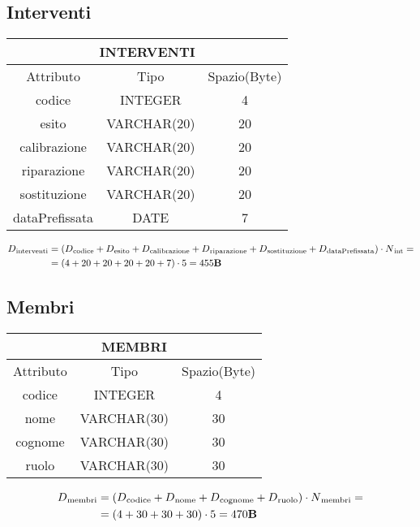 \subsection{Interventi}
\begin{tabular}{ |c|c|c|}
  \hline
  \multicolumn{3}{|c|}{\textbf{INTERVENTI}} \\
  \hline
  Attributo & Tipo & Spazio(Byte) \\
  \hline
  codice & INTEGER & 4 \\
  esito & VARCHAR(20) & 20 \\
  calibrazione & VARCHAR(20) & 20 \\
  riparazione & VARCHAR(20) & 20 \\
  sostituzione & VARCHAR(20) & 20 \\
  dataPrefissata & DATE & 7 \\
  \hline
\end{tabular}
\begin{equation}
  \begin{aligned}
    D{\text{\textsubscript{interventi}}} &=(D{\text{\textsubscript{codice}}} + D{\text{\textsubscript{esito}}} +D{\text{\textsubscript{calibrazione}}} +D{\text{\textsubscript{riparazione}}} + D{\text{\textsubscript{sostituzione}}} + D{\text{\textsubscript{dataPrefissata}}}) \cdot  N{\text{\textsubscript{int}}} =\\
    &=(4+20+20+20+20+7)\cdot 5 = 455\textbf{B}
  \end{aligned}
\end{equation}
\subsection{Membri}
\begin{tabular}{ |c|c|c|}
  \hline
  \multicolumn{3}{|c|}{\textbf{MEMBRI}}\\
  \hline
  Attributo & Tipo & Spazio(Byte) \\
  \hline
  codice & INTEGER & 4 \\
  nome & VARCHAR(30) & 30 \\
  cognome & VARCHAR(30) & 30 \\
  ruolo & VARCHAR(30) & 30\\
  \hline
\end{tabular}
\begin{equation}
  \begin{aligned}
    D{\text{\textsubscript{membri}}} &=(D{\text{\textsubscript{codice}}} + D{\text{\textsubscript{nome}}} +D{\text{\textsubscript{cognome}}} +D{\text{\textsubscript{ruolo}}}) \cdot  N{\text{\textsubscript{membri}}} =\\
    &=(4+30+30+30) \cdot 5 = 470\textbf{B}
  \end{aligned}
\end{equation}
